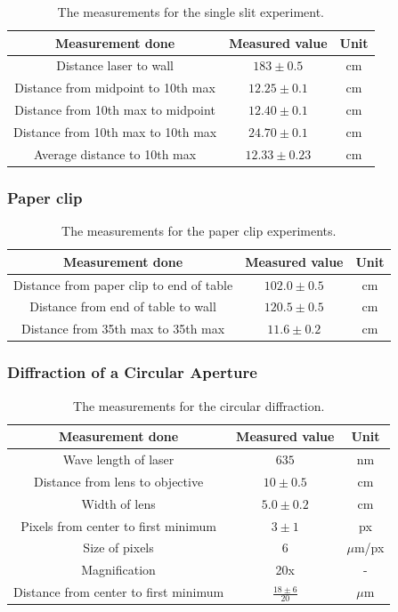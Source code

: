 \documentclass{emulateapj}
\begin{document}
\begin{table}[H]
\begin{tabular}{ c c c }
Measurement done & Measured value & Unit\\
\hline
Distance laser to wall & $183 \pm 0.5$ & cm \\
Distance from midpoint to 10th max & $12.25 \pm 0.1$ & cm\\
Distance from 10th max to midpoint & $12.40 \pm 0.1$ & cm\\
Distance from 10th max to 10th max & $24.70 \pm 0.1$ & cm\\
Average distance to 10th max & $12.33 \pm 0.23$ & cm\\
\end{tabular}
\caption{The measurements for the single slit experiment.}
\end{table}\label{tab:dataSingleSlit}

\subsubsection{Paper clip}

\begin{table}[H]
\begin{tabular}{ c c c }
Measurement done & Measured value & Unit\\
\hline
Distance from paper clip to end of table & $102.0 \pm 0.5$ & cm \\
Distance from end of table to wall & $120.5 \pm 0.5$ & cm \\
Distance from 35th max to 35th max & $11.6 \pm 0.2$ & cm\\
\end{tabular}
\caption{The measurements for the paper clip experiments.}
\end{table}\label{tab:dataPaperClip}

\subsubsection{Diffraction of a Circular Aperture}

\begin{table}[H]
\begin{tabular}{ c c c }
Measurement done & Measured value & Unit\\
\hline
Wave length of laser & $635$ & nm \\
Distance from lens to objective & $10 \pm 0.5$ & cm\\
Width of lens & $5.0 \pm 0.2$ & cm\\
Pixels from center to first minimum & $3 \pm 1$ & px\\
Size of pixels & $6$ & $\mu$m/px\\
Magnification & 20x & -\\
Distance from center to first minimum & $\frac{18 \pm 6}{20}$& $\mu$m
\end{tabular}
\caption{The measurements for the circular diffraction.}
\end{table}\label{tab:dataAiry}
\end{document}

